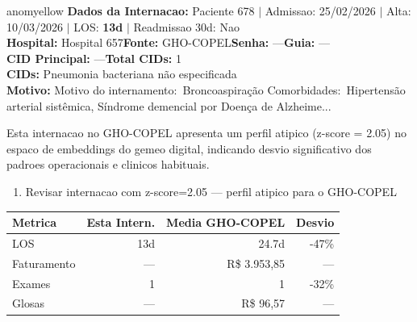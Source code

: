 \documentclass[a4paper,10pt]{article}
\begin{document}
\begin{anomalycard}[Internacao 713 | GHO-COPEL | MODERADO (z=2.05)]{anomyellow}
\textbf{Dados da Internacao:} Paciente 678 $\mid$ Admissao: 25/02/2026 $\mid$ Alta: 10/03/2026 $\mid$ LOS: \textbf{13d} $\mid$ Readmissao 30d: Nao\\
\textbf{Hospital:} Hospital 657\quad\textbf{Fonte:} GHO-COPEL\quad\textbf{Senha:} ---\quad\textbf{Guia:} ---\\
\textbf{CID Principal:} {\small ---}\quad\textbf{Total CIDs:} 1\\

\textbf{CIDs:} {\scriptsize Pneumonia bacteriana não especificada}\\

\textbf{Motivo:} {\scriptsize Motivo do internamento: Broncoaspiração  Comorbidades: Hipertensão arterial sistêmica, Síndrome demencial por Doença de Alzheime...}\\

\vspace{2pt}\begin{tcolorbox}[colback=severityred!20,colframe=anomyellow,title={\textbf{Interpretacao de Negocio}},fonttitle=\bfseries\small,left=4pt,right=4pt,top=3pt,bottom=3pt]
{\small Esta internacao no GHO-COPEL apresenta um perfil atipico (z-score = 2.05) no espaco de embeddings do gemeo digital, indicando desvio significativo dos padroes operacionais e clinicos habituais.}
\end{tcolorbox}
\begin{tcolorbox}[colback=severityyellow!30,colframe=anomorange,title={\textbf{Recomendacoes Especificas}},fonttitle=\bfseries\small,left=4pt,right=4pt,top=3pt,bottom=3pt]
\begin{enumerate}[nosep,leftmargin=16pt]
\item {\small Revisar internacao com z-score=2.05 --- perfil atipico para o GHO-COPEL}
\end{enumerate}
\end{tcolorbox}
\begin{center}\begin{tabular}{l r r r}\toprule\textbf{Metrica} & \textbf{Esta Intern.} & \textbf{Media GHO-COPEL} & \textbf{Desvio} \\\midrule
LOS & 13d & 24.7d & -47\% \\
Faturamento & --- & R\$ 3.953,85 & --- \\
Exames & 1 & 1 & -32\% \\
Glosas & --- & R\$ 96,57 & --- \\
\bottomrule\end{tabular}\end{center}


\end{anomalycard}
\end{document}
